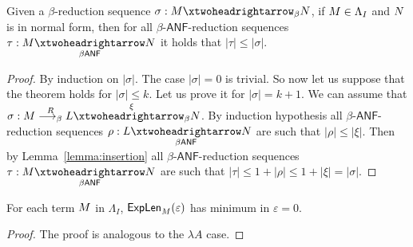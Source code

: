 \begin{theorem}\label{theorem:revstd}
	Given a $\beta$-reduction sequence
	$\sigma:\termone \redbetared{} \termtwo$, if $M\in \Lambda_I$ and $N$ is in normal form, then for all $\beta$-$\mathsf{ANF}$-reduction sequences $\tau:\termone\redbetaredanf{} \termtwo$ it holds that $|\tau|\leq |\sigma|$.
\end{theorem}
\begin{proof}
	By induction on $|\sigma|$. The case $|\sigma|=0$ is trivial. So now let us suppose that the theorem holds for $|\sigma|\leq k$. Let us prove it for $|\sigma|= k+1$. We can assume that $\sigma:\termone \redbetardx{\rdxone}  \termthree \redbetared{\xi}   \termtwo$.
	By induction hypothesis all $\beta$-$\mathsf{ANF}$-reduction sequences $\rho:\termthree \redbetaredanf{} \termtwo$ are such that $|\rho|\leq |\xi|$. Then by Lemma~\ref{lemma:insertion} all $\beta$-$\mathsf{ANF}$-reduction sequences $\tau:\termone\redbetaredanf{} \termtwo$ are such that $|\tau|\leq 1+|\rho|\leq 1+|\xi|=|\sigma|$.
\end{proof}
\begin{corollary}
	For each term $M$ in $\Lambda_{I}$, $\textsf{ExpLen}_{M}(\varepsilon)$ has minimum in $\varepsilon=0$.
\end{corollary}
\begin{LONG}
	\begin{proof}
		The proof is analogous to the $\lambda A$ case.
	\end{proof}
\end{LONG}